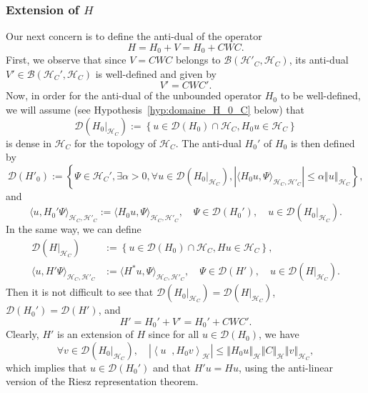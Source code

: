 \documentclass[AHL,Unicode,longabstracts,published]{cedram}
\newcommand{\Hi}{\mathcal{H}}
\newcommand{\norme}[1]{\left\Vert #1\right\Vert}
\newcommand{\scal}[2]{\left\langle{#1} \middle., {#2}\right\rangle}
\newcommand{\abso}[1]{\left|{#1}\right|}
\newcommand{\clB}{\mathcal{B}}
\newcommand{\clD}{\mathcal{D}}
\let\oldexists\exists
\renewcommand*{\exists}{\mathrel{\oldexists}}
\let\oldforall\forall
\renewcommand*{\forall}{\mathrel{\oldforall}}
\newcommand{\Hi}{\mathcal{H}}
\begin{document}
\subsubsection{Extension of \texorpdfstring{$H$}{H}}
Our next concern is to define the anti-dual of the operator
\begin{equation*}
H=H_0+V=H_0+CWC.
\end{equation*}
First, we observe that since $V=CW C$ belongs to $\clB(\Hi'_C,\Hi_C)$, its anti-dual $V'\in\clB(\Hi_C',\Hi_C)$ is well-defined and given by
\begin{equation*}
V'=CW C'.
\end{equation*}
Now, in order for the anti-dual of the unbounded operator $H_0$ to be well-defined, we will assume (see Hypothesis~\ref{hyp:domaine_H_0_C} below) that
\begin{equation*}
\clD({H_0}|_{\Hi_C}):=\left\lbrace u\in\clD(H_0)\cap\Hi_C, H_0u\in\Hi_C\right\rbrace
\end{equation*}
is dense in $\Hi_C$ for the topology of $\Hi_C$. The anti-dual $H_0'$ of $H_0$ is then defined by
\begin{equation*}
\clD(H'_0):=\left\lbrace \Psi\in\Hi_C',\exists \alpha>0,\forall u\in\clD\left({H_0}|_{\Hi_C}\right),\left|\langle H_0u,\Psi\rangle_{\Hi_C,\Hi'_C}\right|\leq\alpha\norme{u}_{\Hi_C}\right\rbrace,
\end{equation*}
and
\begin{equation*}
\langle u,H_0'\Psi\rangle_{\Hi_C,\Hi'_C}:=\langle H_0u,\Psi\rangle_{\Hi_C,\Hi'_C}, \quad \Psi\in\clD(H_0'), \quad u\in\clD({H_0}|_{\Hi_C}).
\end{equation*}
In the same way, we can define
\begin{align*}
\clD(H|_{\Hi_C}) &{:=}\left\lbrace u\in\clD(H_0)\cap\Hi_C,Hu\in\Hi_C\right\rbrace,
\\
\langle u,H'\Psi \rangle_{\Hi_C,\Hi'_C} &{:=}\langle H^*u,\Psi\rangle_{\Hi_C,\Hi'_C}, \quad \Psi\in\clD(H'), \quad u\in\clD({H}|_{\Hi_C}).
\end{align*}
Then it is not difficult to see that $\clD({H_0}|_{\Hi_C})=\clD(H|_{\Hi_C})$, $\clD(H_0')=\clD(H')$, and
\begin{equation*}
H'=H_0'+V'=H_0'+CW C'.
\end{equation*}
Clearly, $H'$ is an extension of $H$ since for all $u\in\clD(H_0)$, we have
\begin{equation*}
\forall v\in\clD({H_0}|_{\Hi_C}), \quad \abso{\scal{u}{H_0v}_\Hi}\leq\norme{H_0u}_{\Hi}\norme{C}_\Hi\norme{v}_{\Hi_C},
\end{equation*}
which implies that $u\in\clD(H_0')$ and that $H'u=Hu$, using the anti-linear version of the Riesz representation theorem.
\end{document}

